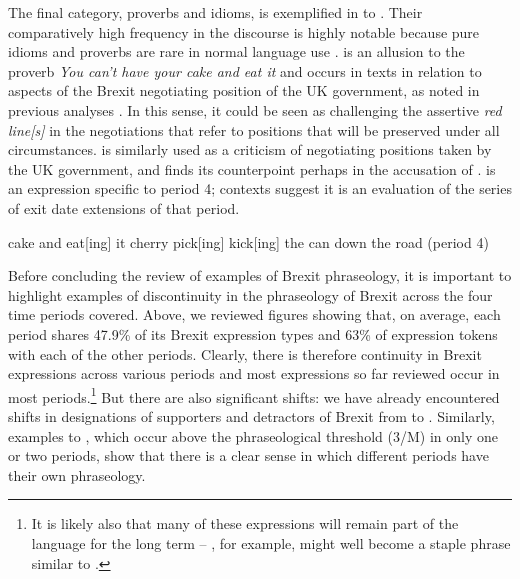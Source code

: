 \documentclass[output=paper]{langscibook}
\begin{document}
The final category, proverbs and idioms, is exemplified in  to . Their comparatively high frequency in the discourse is highly notable because pure idioms and proverbs are rare in normal language use \citep{Moon1998}.  is an allusion to the proverb \textit{You can’t have your cake and eat it} and occurs in texts in relation to aspects of the Brexit negotiating position of the UK government, as noted in previous analyses \citep{Charteris-Black2019,Musolff2019}. In this sense, it could be seen as challenging the assertive \textit{red line[s]}  in the negotiations that refer to positions that will be preserved under all circumstances.  is similarly used as a criticism of negotiating positions taken by the UK government, and finds its counterpoint perhaps in the accusation of .  is an expression specific to period 4; contexts suggest it is an evaluation of the series of exit date extensions of that period. 

\ea\relax [have] cake and eat[ing] it\label{ex:buerki:53}
\ex cherry pick[ing]\label{ex:buerki:54}
\ex kick[ing] the can down the road (period 4)\label{ex:buerki:55}
\z

Before concluding the review of examples of Brexit phraseology, it is important to highlight examples of discontinuity in the phraseology of Brexit across the four time periods covered. Above, we reviewed figures showing that, on average, each period shares 47.9\% of its Brexit expression types and 63\% of expression tokens with each of the other periods. Clearly, there is therefore continuity in Brexit expressions across various periods and most expressions so far reviewed occur in most periods.\footnote{It is likely also that many of these expressions will remain part of the language for the long term -- , for example, might well become a staple phrase similar to .} But there are also significant shifts: we have already encountered shifts in designations of supporters and detractors of Brexit from  to . Similarly, examples  to , which occur above the phraseological threshold (3/M) in only one or two periods, show that there is a clear sense in which different periods have their own phraseology.
\end{document}
